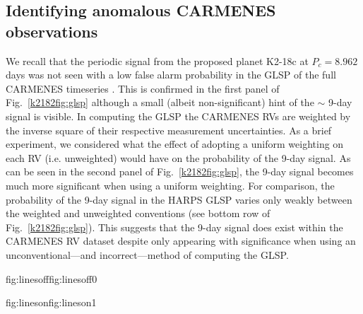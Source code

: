 \subsection{Identifying anomalous CARMENES observations} \label{k2182sect:anomalous}
We recall that the periodic signal from the proposed planet K2-18c at $P_c=8.962$ days was not seen with a low
false alarm probability in the GLSP of the full CARMENES timeseries . This is confirmed in the
first panel of Fig.~\ref{k2182fig:glsp} although a small (albeit non-significant) hint of the $\sim$ 9-day signal is visible.
In computing the GLSP the CARMENES RVs are weighted by the inverse square of their respective measurement
uncertainties. As a brief experiment, we considered what the effect of adopting a uniform weighting on each RV (i.e.
unweighted) would have on the probability of
the 9-day signal. As can be seen in the second panel of Fig.~\ref{k2182fig:glsp}, the 9-day signal becomes much more significant
when using a uniform weighting. For comparison, the probability of the 9-day signal in the HARPS GLSP varies only weakly
between the weighted and unweighted conventions (see bottom row of Fig.~\ref{k2182fig:glsp}).
This suggests that the 9-day signal {does} exist within the CARMENES RV
dataset despite only appearing with significance when using an unconventional---and incorrect---method of computing the
GLSP.

\begin{figure*}
  \centering
  \hspace{-\hsize}%
  \begin{ocg}{fig:linesoff}{fig:linesoff}{0}%
  \end{ocg}%
  \begin{ocg}{fig:lineson}{fig:lineson}{1}%
  \end{ocg}
  \hspace{-\hsize}%
  \caption[The sensitivity of the probability of the periodic signal $P_c=8.962$ days with different weighting
  schemes in HARPS and CARMENES.]
    {\small Bayesian generalized Lomb-Scargle periodograms for various subsets of the published CARMENES and HARPS RVs 
    with one of a pair of possible weighting schemes. The details of the timeseries shown in each panel are
    annotated above the panel. The three
     depict the orbital
    period of the proposed non-transiting planet K2-18c ($P_c=8.962$ days), the orbital period of the known
    transiting planet K2-18b ($P_b=32.93963$ days), and the photometric stellar rotation period
    ($P_{\text{rot}}=38.6$ days). The $P_c$ signal posited to be due to a second, non-transiting planet
    is seen at high relative probability in all but the full CARMENES RV timeseries from 
    with a $1/\sigma_{\text{RV}}^2$ weighting.}
  \label{k2182fig:glsp}
\end{figure*}

